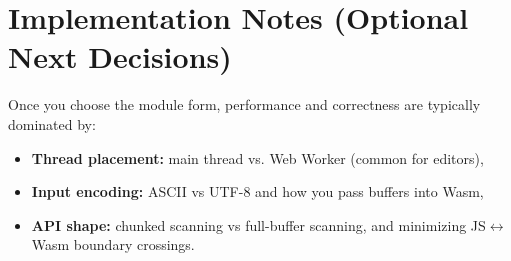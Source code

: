 \documentclass[11pt]{article}
\begin{document}
\section*{Implementation Notes (Optional Next Decisions)}
Once you choose the module form, performance and correctness are typically dominated by:
\begin{itemize}[leftmargin=*, itemsep=0.3em]
  \item \textbf{Thread placement:} main thread vs. Web Worker (common for editors),
  \item \textbf{Input encoding:} ASCII vs UTF-8 and how you pass buffers into Wasm,
  \item \textbf{API shape:} chunked scanning vs full-buffer scanning, and minimizing JS$\leftrightarrow$Wasm boundary crossings.
\end{itemize}
\end{document}
